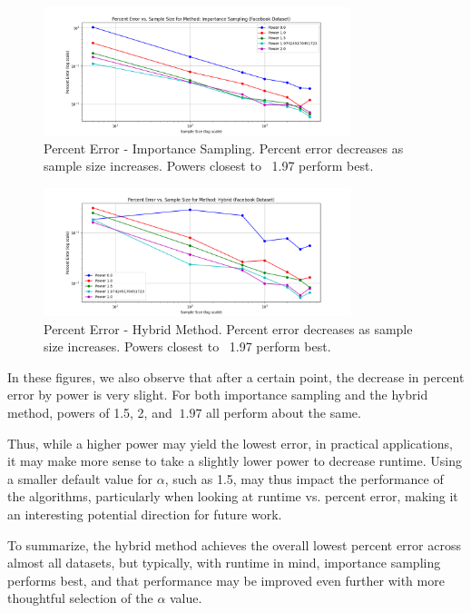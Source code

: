 \documentclass[11pt, margin=1in]{article}
\begin{document}
\begin{figure}[H]
    \centering
    \includegraphics[width=0.8\textwidth]{plots/percent-errors/percent_error_Importance Sampling.png}
    \caption{Percent Error - Importance Sampling. Percent error decreases as sample size increases. Powers closest to ~1.97 perform best.}
    \label{fig:percent_error_importance}
\end{figure}

\begin{figure}[H]
    \centering
    \includegraphics[width=0.8\textwidth]{plots/percent-errors/percent_error_Hybrid.png}
    \caption{Percent Error - Hybrid Method. Percent error decreases as sample size increases. Powers closest to ~1.97 perform best.}
    \label{fig:percent_error_variance_importance}
\end{figure}

In these figures, we also observe that after a certain point, the decrease in percent error by power is very slight.
For both importance sampling and the hybrid method, powers of 1.5, 2, and $~ 1.97$ all perform about the same.

Thus, while a higher power may yield the lowest error, in practical applications, it may make more sense to take a slightly lower power to decrease runtime.
Using a smaller default value for $\alpha$, such as 1.5, may thus impact the performance of the algorithms, particularly when looking at runtime vs. percent error, making it an interesting potential direction for future work.

To summarize, the hybrid method achieves the overall lowest percent error across almost all datasets, but typically, with runtime in mind, importance sampling performs best, and that performance may be improved even further with more thoughtful selection of the $\alpha$ value.
\end{document}
